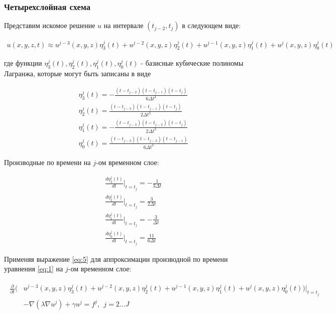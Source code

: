 \documentclass[12pt]{article}
\begin{document}
\vspace{3mm}

\subsubsection{Четырехслойная схема}

\noindent Представим искомое решение $u$ на интервале $(t_{j-2}, t_j)$ в следующем виде:

\begin{align}
  \label{eq:5} u(x, y, z, t) \approx u^{j-3}(x, y, z)\eta^j_3(t) +
                        u^{j-2}(x, y, z)\eta^j_2(t) + 
                        u^{j-1}(x, y, z)\eta^j_1(t) +
                        u^{j}(x, y, z)\eta^j_0(t)
\end{align}

\vspace{5mm}
\noindent где функции $\eta^j_3(t), \eta^j_2(t), \eta^j_1(t), \eta^j_0(t)$ - базисные кубические полиномы
  Лагранжа, которые могут быть записаны в виде

\begin{align}
  &\eta^j_3(t) = -\frac{(t - t_{j-2})(t - t_{j-1})(t - t_{j})}{6\Delta t^3} \\
  &\eta^j_2(t) = \frac{(t - t_{j-3})(t - t_{j-1})(t - t_{j})}{2\Delta t^3} \\
  &\eta^j_1(t) = -\frac{(t - t_{j-3})(t - t_{j-2})(t - t_{j})}{2\Delta t^3} \\
  &\eta^j_0(t) = \frac{(t - t_{j-3})(t - t_{j-2})(t - t_{j-1})}{6\Delta t^3}
\end{align}

\vspace{5mm}
\noindent Производные по времени на $j$-ом временном слое:

\begin{align}
  &\frac{d\eta^j_3(t)}{dt}\bigg|_{t = t_j} = -\frac{1}{3 \Delta t} \\
  &\frac{d\eta^j_2(t)}{dt}\bigg|_{t = t_j} = \frac{3}{2 \Delta t} \\
  &\frac{d\eta^j_1(t)}{dt}\bigg|_{t = t_j} = -\frac{3}{\Delta t} \\
  &\frac{d\eta^j_0(t)}{dt}\bigg|_{t = t_j} = \frac{11}{6 \Delta t}
\end{align}

\vspace{5mm}
\noindent Применяя выражение \ref{eq:5} для аппроксимации производной по времени уравнения \ref{eq:1}
  на $j$-ом временном слое:

\begin{align}
  \begin{split}
    \frac{\partial}{\partial t}(
      &u^{j-3}(x, y, z)\eta^j_3(t) + 
      u^{j-2}(x, y, z)\eta^j_2(t) + 
      u^{j-1}(x, y, z)\eta^j_1(t) +
      u^{j}(x, y, z)\eta^j_0(t)
    )\bigg|_{t = t_j} \\ 
    &- \nabla(\lambda \nabla u^j) + \gamma u^j = f^j, \ \ j = 2...J
  \end{split}
\end{align}
\end{document}
